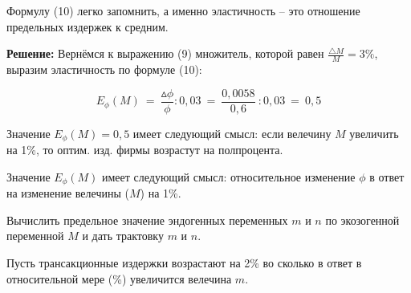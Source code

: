 \documentclass[12pt,a4paper]{article}
\begin{document}
Формулу (10) легко запомнить, а именно эластичность -- это отношение предельных издержек к средним.

\textbf{Решение:} Вернёмся к выражению (9) множитель, которой равен $\displaystyle{\frac{\triangle M}{M} = 3\%}$, выразим эластичность по формуле (10):

\begin{equation*}
E_{\phi }( M) \ =\ \frac{\vartriangle \phi }{\phi } :0,03\ =\ \frac{0,0058}{0,6} \ :0,03\ =\ 0,5
\end{equation*}

Значение $E_{\phi}(M) = 0,5$ имеет следующий смысл: если велечину $M$ увеличить на 1\%, то оптим. изд. фирмы возрастут на полпроцента.

Значение $E_{\phi}(M)$ имеет следующий смысл: относительное изменение $\phi$ в ответ на изменение велечины ($M$) на 1\%. 


 Вычислить предельное значение эндогенных переменных $m$ и $n$ по экозогенной переменной $M$ и дать трактовку $m$ и $n$. 

Пусть трансакционные издержки возрастают на 2\% во сколько в ответ в относительной мере (\%) увеличится велечина $m$.
\end{document}
